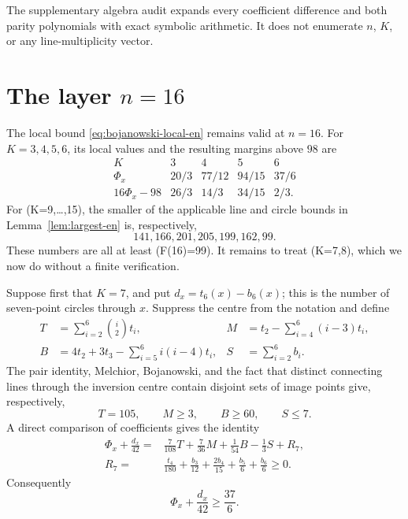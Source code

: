 \documentclass[11pt,a4paper]{article}
\theoremstyle{definition}
\begin{document}
The supplementary algebra audit expands every coefficient difference and both
parity polynomials with exact symbolic arithmetic.  It does not enumerate
\(n\), \(K\), or any line-multiplicity vector.

\section{The layer \texorpdfstring{$n=16$}{n=16}}
\label{sec:n16-en}

The local bound \eqref{eq:bojanowski-local-en} remains valid at \(n=16\).
For \(K=3,4,5,6\), its local values and the resulting margins above \(98\)
are
\[
\begin{array}{c|cccc}
K&3&4&5&6\\ \hline
 \Phi_x&20/3&77/12&94/15&37/6\\
 16\Phi_x-98&26/3&14/3&34/15&2/3.
\end{array}
\]
For (K=9,\ldots,15), the smaller of the applicable line and circle bounds in
Lemma~\ref{lem:largest-en} is, respectively,
\[
141,166,201,205,199,162,99.
\]
These numbers are all at least (F(16)=99).  It remains to treat (K=7,8),
which we now do without a finite verification.

Suppose first that \(K=7\), and put
\(d_x=t_6(x)-b_6(x)\); this is the number of seven-point circles through
\(x\).  Suppress the centre from the notation and define
\[
\begin{aligned}
 T&=\sum_{i=2}^6\binom i2t_i,&
 M&=t_2-\sum_{i=4}^6(i-3)t_i,\\
 B&=4t_2+3t_3-\sum_{i=5}^6i(i-4)t_i,&
 S&=\sum_{i=2}^6b_i.
\end{aligned}
\]
The pair identity, Melchior, Bojanowski, and the fact that distinct connecting
lines through the inversion centre contain disjoint sets of image points give,
respectively,
\[
 T=105,\qquad M\ge3,\qquad B\ge60,\qquad S\le7.
\]
A direct comparison of coefficients gives the identity
\begin{equation}\label{eq:n16-k7-identity-en}
\begin{split}
 \Phi_x+\frac{d_x}{42}
={}&\frac7{108}T+\frac7{36}M+\frac1{54}B-\frac13S+R_7,\\
 R_7={}&\frac{t_4}{180}+\frac{b_3}{12}+\frac{2b_4}{15}
          +\frac{b_5}{6}+\frac{b_6}{6}\ge0.
\end{split}
\end{equation}
Consequently
\begin{equation}\label{eq:n16-k7-local-en}
 \Phi_x+\frac{d_x}{42}\ge\frac{37}{6}.
\end{equation}
\end{document}
